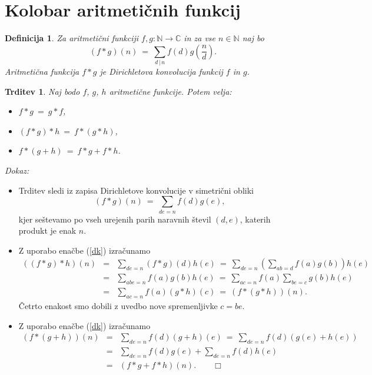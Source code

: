 \documentclass[a4paper,12pt]{article}
\def\N{\mathbb{N}} %
\def\C{\mathbb{C}} %
\def\qedm{\qquad\Box}   %
\newtheorem{trditev}{Trditev}
\newtheorem{definicija}{Definicija}
\begin{document}


\section{Kolobar aritmetičnih funkcij}

\begin{definicija}
Za aritmetični funkciji $f, g: \N \to \C$ in za vse $n \in \N$ naj bo 
\[
(f * g)(n) \ =\ \sum_{d\,|\,n} f(d)g\left(\frac{n}{d}\right).
\]
Aritmetična funkcija $f * g$ je {\em Dirichletova konvolucija\/} funkcij $f$ in $g$.
\end{definicija}

\begin{trditev}
\label{kolo}
Naj bodo $f$, $g$, $h$ aritmetične funkcije. Potem velja:
\begin{itemize}
\item[\rm (i)] $f * g \ =\ g * f$,
\item[\rm (ii)] $(f * g) * h \ =\ f * (g * h)$,
\item[\rm (iii)] $f * (g + h) \ =\ f * g + f * h$.
\end{itemize}
\end{trditev}

\noindent
{\em Dokaz:\/} 
\begin{itemize}
\item[\rm (i)] 
Trditev sledi iz zapisa Dirichletove konvolucije v simetrični obliki
\begin{equation}
\label{dk}
(f * g)(n) \ =\ \sum_{d e = n} f(d)g(e),
\end{equation}
kjer seštevamo po vseh urejenih parih naravnih števil $(d,e)$, katerih produkt je enak $n$.

\item[\rm (ii)] 
Z uporabo enačbe (\ref{dk}) izračunamo
\begin{eqnarray*}
((f * g) * h)(n) &=& \sum_{d e = n} (f * g)(d)h(e)
\ =\ \sum_{d e = n} \left(\sum_{a b = d} f(a)g(b)\right)h(e) \\
 &=& \sum_{a b e = n} f(a)g(b)h(e)
 \ =\ \sum_{a c = n} f(a) \sum_{b e = c} g(b)h(e) \\
 &=& \sum_{a c = n} f(a) (g * h)(c)
 \ =\ (f * (g * h))(n).
\end{eqnarray*}
Četrto enakost smo dobili z uvedbo nove spremenljivke $c = b e$.


\item[\rm (iii)]
Z uporabo enačbe (\ref{dk}) izračunamo
\begin{eqnarray*}
(f * (g + h))(n) &=& \sum_{d e = n} f(d)(g+h)(e)
\ =\ \sum_{d e = n} f(d)(g(e)+h(e)) \\
 &=& \sum_{d e = n} f(d)g(e) + \sum_{d e = n} f(d)h(e) \\
 &=& (f * g + f * h)(n). \qedm
\end{eqnarray*}

\end{itemize}
\end{document}
